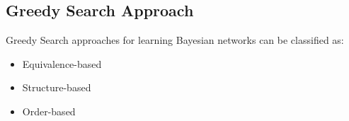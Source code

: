 \subsection{Greedy Search Approach}


\begin{frame}
	Greedy Search approaches for learning Bayesian networks can be classified as:
	\begin{itemize}
		\item Equivalence-based
		\item Structure-based
		\item Order-based
	\end{itemize}
\end{frame}